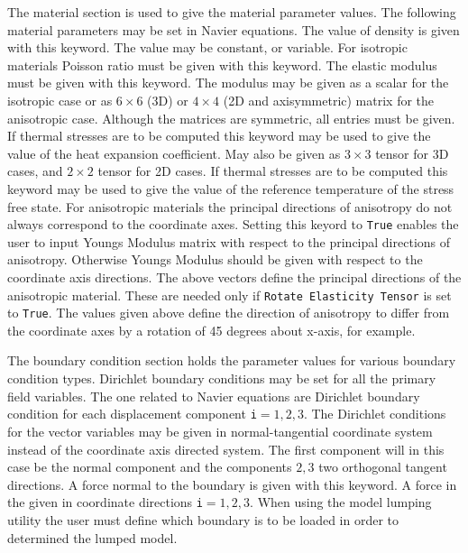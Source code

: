 The material section is used to give the material parameter values. The
following material parameters may be set in Navier equations.
\sifbegin
{}
The value of density is given with this keyword. The value may be constant,
or variable.
For isotropic materials Poisson ratio must be given with this keyword.
 The elastic modulus must be given with this
keyword. The modulus may be given as a scalar for the isotropic case or
as $6\times6$ (3D) or $4\times4$
(2D and axisymmetric) matrix for the anisotropic case. Although
the matrices are symmetric, all entries must be given.
 If thermal stresses are to be computed
this keyword may be used to give the value of the heat expansion coefficient.
May also be given as $3\times3$ tensor for 3D cases, and $2\times2$ tensor for
2D cases.
 If thermal stresses are to be computed
this keyword may be used to give the value of the reference temperature
of the stress free state.
 For anisotropic materials 
the principal directions of anisotropy do not always correspond to the
coordinate axes. Setting this keyord to {\tt True} enables the user to
input Youngs Modulus matrix with respect to the principal directions 
of anisotropy. Otherwise Youngs Modulus should be given with respect 
to the coordinate axis directions.
The above vectors define the principal directions of the anisotropic 
material. These are needed only if {\tt Rotate Elasticity Tensor} is set 
to {\tt True}. The values given above define the direction of anisotropy
to differ from the coordinate axes by a rotation of 45 degrees about 
x-axis, for example.
\sifend



The boundary condition section holds the parameter values for various
boundary condition types. Dirichlet boundary conditions may be
set for all the primary field variables. The one related to Navier equations
are
\sifbegin
{} 
Dirichlet boundary condition
for each displacement component {\tt i}$=1,2,3$.
The Dirichlet conditions for the vector variables may be given in normal-tangential
coordinate system instead of the coordinate axis directed system. The first component
will in this case be the normal component and the components $2,3$ two orthogonal
tangent directions.
A force normal to the boundary is given with this keyword.
A  force in the given in coordinate directions {\tt i}$=1,2,3$.
When using the model lumping utility the user must define
which boundary is to be loaded in order to determined the 
lumped model. 
\sifend
\sifend




